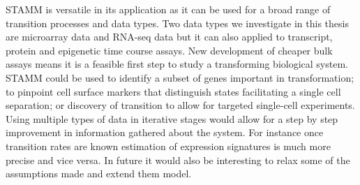 STAMM is versatile in its application as it can be used for a broad range of transition processes and data types. Two data types we investigate in this thesis are microarray data and RNA-seq data but it can also applied to transcript, protein and epigenetic time course assays. New development of cheaper bulk assays means it is a feasible first step to study a transforming biological system. STAMM could be used to identify a subset of genes important in transformation; to pinpoint cell surface markers that distinguish states facilitating a single cell separation; or discovery of transition to allow for targeted single-cell experiments. Using multiple types of data in iterative stages would allow for a step by step improvement in information gathered about the system. For instance once transition rates are known estimation of expression signatures is much more precise and vice versa. In future it would also be interesting to relax some of the assumptions made and extend them model.


